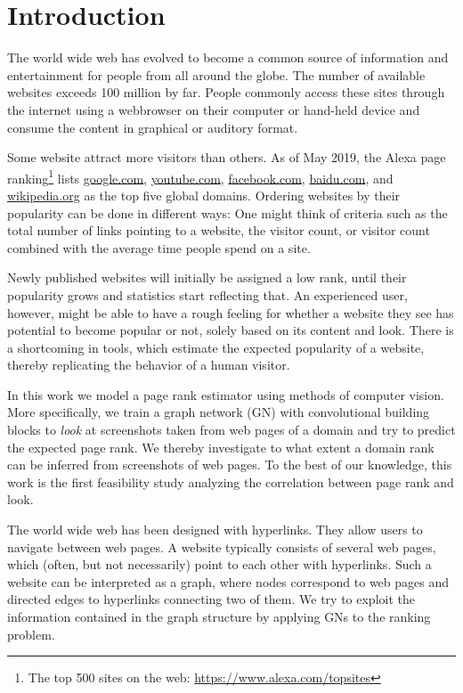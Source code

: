 \section{Introduction}
\label{section:introduction}

The world wide web has evolved to become a common source of information and entertainment for people from all around the globe. The number of available websites exceeds 100 million by far.
People commonly access these sites through the internet using a webbrowser on their computer or hand-held device and consume the content in graphical or auditory format.

Some website attract more visitors than others. As of May 2019, the Alexa page ranking\footnote{The top 500 sites on the web: \url{https://www.alexa.com/topsites}} lists \url{google.com}, \url{youtube.com}, \url{facebook.com}, \url{baidu.com}, and \url{wikipedia.org} as the top five global domains. Ordering websites by their popularity can be done in different ways: One might think of criteria such as the total number of links pointing to a website, the visitor count, or visitor count combined with the average time people spend on a site.

Newly published websites will initially be assigned a low rank, until their popularity grows and statistics start reflecting that. An experienced user, however, might be able to have a rough feeling for whether a website they see has potential to become popular or not, solely based on its content and look. There is a shortcoming in tools, which estimate the expected popularity of a website, thereby replicating the behavior of a human visitor.

In this work we model a page rank estimator using methods of computer vision. More specifically, we train a graph network (GN) with convolutional building blocks to \textit{look} at screenshots taken from web pages of a domain and try to predict the expected page rank. We thereby investigate to what extent a domain rank can be inferred from screenshots of web pages. To the best of our knowledge, this work is the first feasibility study analyzing the correlation between page rank and look.

The world wide web has been designed with hyperlinks. They allow users to navigate between web pages. A website typically consists of several web pages, which (often, but not necessarily) point to each other with hyperlinks. Such a website can be interpreted as a graph, where nodes correspond to web pages and directed edges to hyperlinks connecting two of them. We try to exploit the information contained in the graph structure by applying GNs to the ranking problem.

